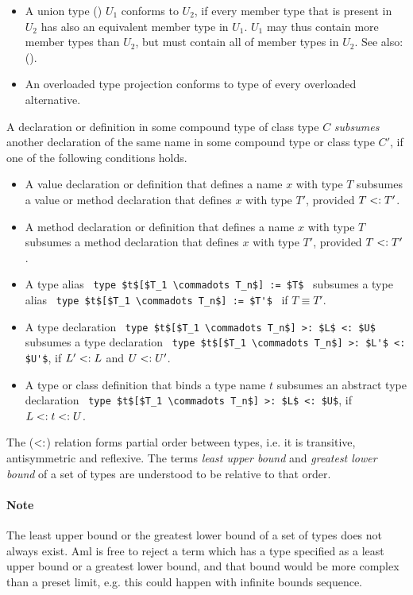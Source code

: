 \begin{itemize}
  \item A union type () $U_1$ conforms to $U_2$, if every member type that is present in $U_2$ has also an equivalent member type in $U_1$. $U_1$ may thus contain more member types than $U_2$, but must contain all of member types in $U_2$. See also: ().

  \item An overloaded type projection conforms to type of every overloaded alternative. 
\end{itemize}

A declaration or definition in some compound type of class type $C$ {\em subsumes} another declaration of the same name in some compound type or class type $C'$, if one of the following conditions holds. 
  \begin{itemize}
  \item A value declaration or definition that defines a name $x$ with type $T$ subsumes a value or method declaration that defines $x$ with type $T'$, provided $T <: T'$. 
  \item A method declaration or definition that defines a name $x$ with type $T$ subsumes a method declaration that defines $x$ with type $T'$, provided $T <: T'$. 
  \item A type alias ~\lstinline!type $t$[$T_1 \commadots T_n$] := $T$!~ subsumes a type alias ~\lstinline!type $t$[$T_1 \commadots T_n$] := $T'$!~ if $T \equiv T'$. 
  \item A type declaration ~\lstinline!type $t$[$T_1 \commadots T_n$] >: $L$ <: $U$!~ subsumes a type declaration ~\lstinline!type $t$[$T_1 \commadots T_n$] >: $L'$ <: $U'$!, if $L' <: L$ and $U <: U'$. 
  \item A type or class definition that binds a type name $t$ subsumes an abstract type declaration ~\lstinline!type $t$[$T_1 \commadots T_n$] >: $L$ <: $U$!, if $L <: t <: U$. 
  \end{itemize}

The ($<:$) relation forms partial order between types, i.e. it is transitive, antisymmetric and reflexive. The terms {\em least upper bound} and {\em greatest lower bound} of a set of types are understood to be relative to that order. 

\paragraph{Note}
The least upper bound or the greatest lower bound of a set of types does not always exist. Aml is free to reject a term which has a type specified as a least upper bound or a greatest lower bound, and that bound would be more complex than a preset limit, e.g. this could happen with infinite bounds sequence. 

